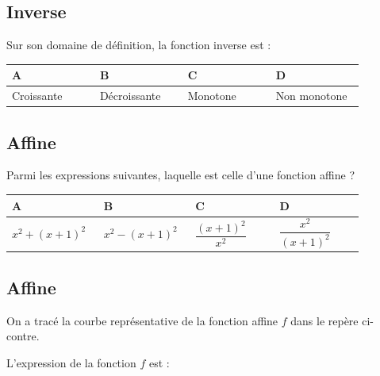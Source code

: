 \documentclass[oneside,12pt]{article}
\begin{document}
\subsection{Inverse}
Sur son domaine de définition, la fonction inverse est :

\begin{center}
	\renewcommand{\arraystretch}{1.35}
	\begin{tabular}{| P{0.22\linewidth} | P{0.22\linewidth} | P{0.22\linewidth} | P{0.22\linewidth} |} \hline
	A & B & C & D \\ \hline
	Croissante & Décroissante & Monotone & Non monotone \\ \hline
	\end{tabular}
\end{center}



\subsection{Affine}
Parmi les expressions suivantes, laquelle est celle d'une fonction affine ?

\begin{center}
	\renewcommand{\arraystretch}{1.35}
	\begin{tabular}{| P{0.22\linewidth} | P{0.22\linewidth} | P{0.22\linewidth} | P{0.22\linewidth} |} \hline
	A & B & C & D \\ \hline
	\rule{0pt}{8mm}
	$x^2+(x+1)^2$ & $x^2-(x+1)^2$ & $\dfrac{(x+1)^2}{x^2}$ & $\dfrac{x^2}{(x+1)^2}$ \\[3.5mm] \hline
	\end{tabular}
\end{center}



\subsection{Affine}
\begin{minipage}{0.6\linewidth} \restoreskip
	On a tracé la courbe représentative de la fonction affine $f$ dans le repère ci-contre.
	
	L'expression de la fonction $f$ est :
\end{minipage} \hspace{5mm}
\begin{minipage}{0.4\linewidth} \vspace{-5mm}
\end{minipage}
\end{document}
